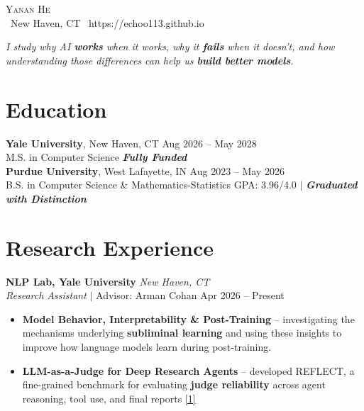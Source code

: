 \documentclass[a4paper,10pt]{article}
\begin{document}

\begin{center}
    {\Large \scshape Yanan He} \\[4pt]   %
    \faMapMarker\ New Haven, CT \quad \faGlobe\ https://echoo113.github.io
\end{center}

\begin{center}
\textit{I study why AI \textbf{works} when it works, why it \textbf{fails} when it doesn't, and how understanding those differences can help us \textbf{build better models}.}
\end{center}
\vspace{2pt}

\section{Education}
\vspace{-2mm}
\textbf{Yale University}, New Haven, CT \hfill Aug 2026 -- May 2028 \\
M.S. in Computer Science \hfill \textbf{\textit{Fully Funded}} \\[4pt]
\textbf{Purdue University}, West Lafayette, IN \hfill Aug 2023 -- May 2026 \\
B.S. in Computer Science \& Mathematics-Statistics \hfill GPA: 3.96/4.0 $\mid$ \textbf{\textit{Graduated with Distinction}}

\section{Research Experience}
\vspace{-3mm}
\setlength{\parindent}{0pt}

\textbf{NLP Lab, Yale University} \hfill \textit{New Haven, CT} \\
\textit{Research Assistant} $\mid$ Advisor: Arman Cohan \hfill Apr 2026 -- Present
\begin{itemize}
  \item \textbf{Model Behavior, Interpretability \& Post-Training} -- investigating the mechanisms underlying \textbf{subliminal learning} and using these insights to improve how language models learn during post-training.
  \item \textbf{LLM-as-a-Judge for Deep Research Agents} -- developed REFLECT, a fine-grained benchmark for evaluating \textbf{judge reliability} across agent reasoning, tool use, and final reports \hyperlink{pub:reflect}{[1]}
\end{itemize}
\end{document}
